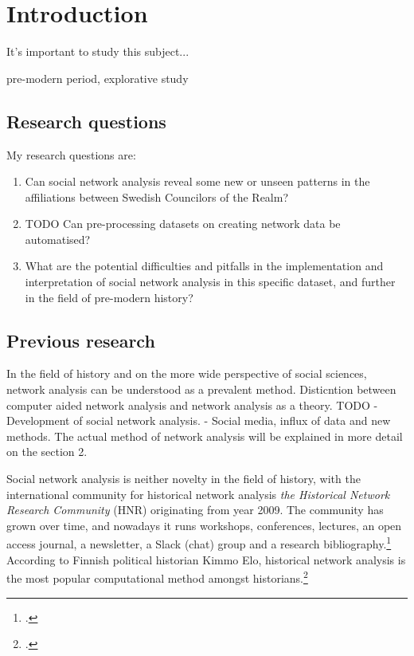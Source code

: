 \documentclass[a4paper,12pt]{article}
\begin{document}
\section{Introduction}

It's important to study this subject...

pre-modern period, explorative study

\subsection{Research questions}

My research questions are:
\begin{enumerate}
	\item Can social network analysis reveal some new or unseen patterns in the affiliations between Swedish Councilors of the Realm?
	\item TODO Can pre-processing datasets on creating network data be automatised?
	\item What are the potential difficulties and pitfalls in the implementation and interpretation of social network analysis in this specific dataset, and further in the field of pre-modern history?
\end{enumerate} 

\subsection{Previous research}
In the field of history and on the more wide perspective of social sciences, network analysis can be understood as a prevalent method. Disticntion between computer aided network analysis and network analysis as a theory.
TODO
- Development of social network analysis. 
- Social media, influx of data and new methods.
The actual method of network analysis will be explained in more detail on the section 2. 



Social network analysis is neither novelty in the field of history, with the international community for historical network analysis \textit{the Historical Network Research Community} (HNR) originating from year 2009. The community has grown over time, and nowadays it runs workshops, conferences, lectures, an open access journal, a newsletter, a Slack (chat) group and a research bibliography.\footcite{hnr} According to Finnish political historian Kimmo Elo, historical network analysis is the most popular computational method amongst historians.\footcite[p. 22.]{elo16} 
\end{document}

